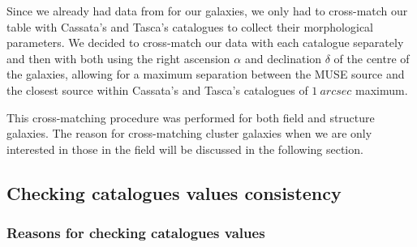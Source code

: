 Since we already had data from  for our galaxies, we only had to cross-match our table with Cassata's and Tasca's catalogues to collect their morphological parameters. We decided to cross-match our data with each catalogue separately and then with both using the right ascension $\alpha$ and declination $\delta$ of the centre of the galaxies, allowing for a maximum separation between the MUSE source and the closest source within Cassata's and Tasca's catalogues of $\SI{1}{arcsec}$ maximum. 

This cross-matching procedure was performed for both field and structure galaxies. The reason for cross-matching cluster galaxies when we are only interested in those in the field will be discussed in the following section.

\subsection{Checking catalogues values consistency}
\subsubsection{Reasons for checking catalogues values}

